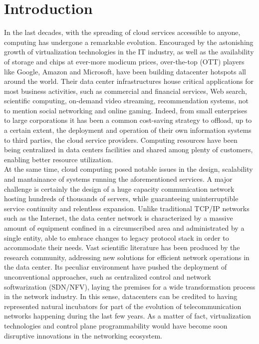 \chapter*{Introduction}
In the last decades,  with the spreading of cloud services accessible to anyone, computing has undergone a remarkable evolution. Encouraged by the astonishing growth of virtualization technologies in the IT industry, as well as the availability of storage and chips at ever-more modicum prices, over-the-top (OTT) players like Google, Amazon and Microsoft, have been building datacenter hotspots all around the world. Their data center infrastructures house critical applications for most business activities, such as commercial and financial services, Web search, scientific computing, on-demand video streaming, recommendation systems, not to mention social networking and online gaming. Indeed, from small enterprises to large corporations it has been a common cost-saving strategy to offload, up to a certain extent, the deployment and operation of their own information systems to third parties, the cloud service providers. Computing resources have been being centralized in data centers facilities and shared among plenty of customers, enabling better resource utilization. \\
At the same time, cloud computing posed notable issues in the design, scalability and mantainance of systems running the aforementioned services. A major challenge is certainly the design of a huge capacity communication network hosting hundreds of thousands of servers, while guaranteeing
uninterruptible service continuity and relentless expansion. Unlike traditional TCP/IP networks such as the Internet, the data center network is characterized by a massive amount of equipment confined in a circumscribed area and administrated by a single entity, able to embrace changes to legacy protocol stack in order to accommodate their needs. 
Vast scientific literature has been produced by the research community, addressing new solutions for efficient network operations in the data center. Its peculiar environment have pushed the deployment %
of unconventional approaches, such as centralized control and network softwarization (SDN/NFV), laying the premises for a wide transformation process in the network industry. In this sense, datacenters can be credited to having represented natural incubators for part of the evolution of telecommunication networks happening during the last few years. As a matter of fact, virtualization technologies and control plane programmability would have become soon disruptive innovations in the networking ecosystem.
